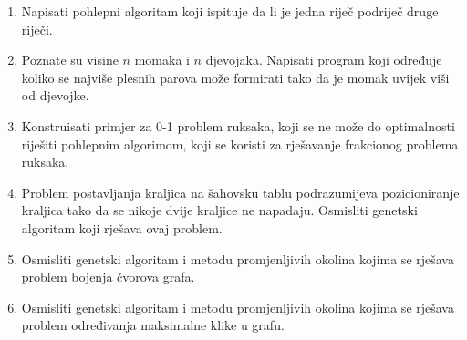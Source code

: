 \documentclass[a4paper, utf8, 11pt, colorlinks]{book}
\begin{document}
\begin{enumerate}
	\item  Napisati pohlepni algoritam koji ispituje da li je jedna riječ podriječ druge riječi.
	
	\item Poznate su visine $n$ momaka i $n$ djevojaka. Napisati program koji
	određuje koliko se najviše plesnih parova može formirati tako da je momak uvijek
	viši od djevojke.
	\item Konstruisati primjer za 0-1 problem ruksaka, koji se ne može do optimalnosti riješiti pohlepnim algorimom, koji se koristi za rješavanje frakcionog problema ruksaka.
	
	
	\item Problem postavljanja kraljica na šahovsku tablu podrazumijeva pozicioniranje kraljica tako da se nikoje dvije kraljice ne napadaju. Osmisliti genetski algoritam koji rješava ovaj problem.
	\item Osmisliti genetski algoritam i metodu promjenljivih okolina kojima se rješava problem bojenja čvorova grafa.
	
	\item Osmisliti genetski algoritam i metodu promjenljivih okolina kojima se rješava problem određivanja maksimalne klike u grafu.
	

\end{enumerate}
\end{document}
